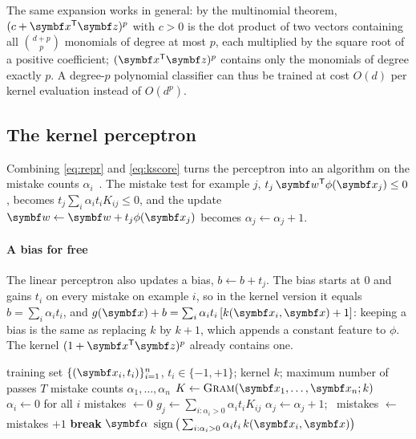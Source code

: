 \documentclass[11pt]{article}
\newcommand{\w}{\vect{w}}
\newcommand{\z}{\vect{z}}
\newcommand{\valpha}{\vect{\alpha}}
\begin{document}
The same expansion works in general: by the multinomial theorem, $(c + \x\T\z)^p$ with $c > 0$ is the dot product of
two vectors containing all $\binom{d+p}{p}$ monomials of degree at most $p$, each multiplied by the square root of a
positive coefficient; $(\x\T\z)^p$ contains only the monomials of degree exactly $p$. A degree-$p$ polynomial classifier
can thus be trained at cost $O(d)$ per kernel evaluation instead of $O(d^p)$.

\subsection{The kernel perceptron}

Combining \eqref{eq:repr} and \eqref{eq:kscore} turns the perceptron into an algorithm on the mistake counts
$\alpha_i$~\cite{aizerman1964,freund1999}. The mistake test for example $j$, $t_j\,\w\T\phi(\x_j) \le 0$, becomes
$t_j\sum_i \alpha_i t_i K_{ij} \le 0$, and the update $\w \gets \w + t_j\phi(\x_j)$ becomes $\alpha_j \gets \alpha_j + 1$.

\paragraph{A bias for free} The linear perceptron also updates a bias, $b \gets b + t_j$. The bias starts at $0$ and
gains $t_i$ on every mistake on example $i$, so in the kernel version it equals $b = \sum_i \alpha_i t_i$, and $g(\x) + b = \sum_i \alpha_i t_i\,[k(\x_i, \x) + 1]$: keeping a bias is the
same as replacing $k$ by $k + 1$, which appends a constant feature to $\phi$. The kernel $(1 + \x\T\z)^p$ already
contains one.

\begin{algorithm}[htbp]
\caption{Kernel perceptron}\label{alg:kperc}
\begin{algorithmic}[1]
\Require training set $\{(\x_i, t_i)\}_{i=1}^n$, $t_i \in \{-1,+1\}$; kernel $k$; maximum number of passes $T$
\Ensure mistake counts $\alpha_1, \dots, \alpha_n$
  \State $K \gets \textsc{Gram}(\x_1, \dots, \x_n; k)$ 
  \State $\alpha_i \gets 0$ for all $i$
    \State mistakes $\gets 0$
     
      \State $g_j \gets \sum_{i : \alpha_i > 0} \alpha_i t_i K_{ij}$ 
        \State $\alpha_j \gets \alpha_j + 1$; \ mistakes $\gets$ mistakes $+ 1$
      \EndIf
    \EndFor
     \textbf{break} \EndIf
  \EndFor
  \State \Return $\valpha$
\EndFunction
{}
  \State \Return $\operatorname{sign}\big(\sum_{i : \alpha_i > 0} \alpha_i t_i\, k(\x_i, \x)\big)$
\EndFunction
\end{algorithmic}
\end{algorithm}
\end{document}
